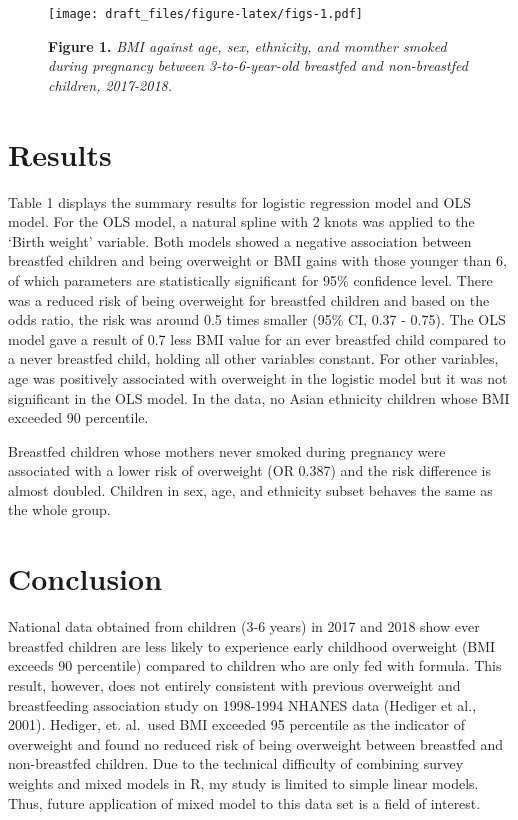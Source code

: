\documentclass[
]{article}
\begin{document}
\begin{figure}
\centering
\texttt{[image: draft\_files/figure-latex/figs-1.pdf]}
\caption{\textbf{Figure 1.} \emph{BMI against age, sex, ethnicity, and
momther smoked during pregnancy between 3-to-6-year-old breastfed and
non-breastfed children, 2017-2018.}}
\end{figure}

\hypertarget{results}{%
\section{Results}\label{results}}

Table 1 displays the summary results for logistic regression model and
OLS model. For the OLS model, a natural spline with 2 knots was applied
to the `Birth weight' variable. Both models showed a negative
association between breastfed children and being overweight or BMI gains
with those younger than 6, of which parameters are statistically
significant for 95\% confidence level. There was a reduced risk of being
overweight for breastfed children and based on the odds ratio, the risk
was around 0.5 times smaller (95\% CI, 0.37 - 0.75). The OLS model gave
a result of 0.7 less BMI value for an ever breastfed child compared to a
never breastfed child, holding all other variables constant. For other
variables, age was positively associated with overweight in the logistic
model but it was not significant in the OLS model. In the data, no Asian
ethnicity children whose BMI exceeded 90 percentile.

Breastfed children whose mothers never smoked during pregnancy were
associated with a lower risk of overweight (OR 0.387) and the risk
difference is almost doubled. Children in sex, age, and ethnicity subset
behaves the same as the whole group.

\hypertarget{conclusion}{%
\section{Conclusion}\label{conclusion}}

National data obtained from children (3-6 years) in 2017 and 2018 show
ever breastfed children are less likely to experience early childhood
overweight (BMI exceeds 90 percentile) compared to children who are only
fed with formula. This result, however, does not entirely consistent
with previous overweight and breastfeeding association study on
1998-1994 NHANES data (Hediger et al., 2001). Hediger, et. al.~used BMI
exceeded 95 percentile as the indicator of overweight and found no
reduced risk of being overweight between breastfed and non-breastfed
children. Due to the technical difficulty of combining survey weights
and mixed models in R, my study is limited to simple linear models.
Thus, future application of mixed model to this data set is a field of
interest.
\end{document}
